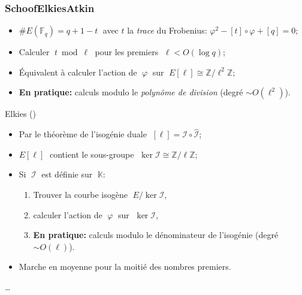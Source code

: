 \documentclass[10pt]{beamer}
\newcommand{\card}[1]{\# #1}  %
\newcommand{\Z}{\mathbb{Z}}  %
\newcommand{\K}{\mathbb{K}}  %
\newcommand{\F}{\mathbb{F}}  %
\newcommand{\isom}{\cong}  %
\newcommand{\frob}{\varphi}  %
\newcommand{\0}{\mathcal{O}}  %
\newcommand{\isog}[1]{\mathcal{#1}}  %
\newcommand{\I}{\isog{I}}  %
\begin{document}

\begin{frame}
  \frametitle{S{\scriptsize choof}E{\scriptsize lkies}A{\scriptsize tkin}}

  \begin{block}{\cite{schoof85}}
    \begin{itemize}
    \item $\card{E(\F_q)} = q + 1 - t\;$ avec $t$ la \emph{trace} du Frobenius:
      $\frob^2 - [t]\circ\frob + [q] = 0$;
    \item Calculer $\;t\bmod\ell\;$ pour les premiers $\;\ell<O(\log q)$;
    \item Équivalent à calculer l'action de $\;\frob\;$ sur $\;E[\ell]\isom\Z/\ell^2\Z$;
    \item \textbf{En pratique:} calculs modulo le \emph{polynôme de
        division} (\alert{degré $\sim O(\ell^2)$}).
    \end{itemize}
  \end{block}

  \begin{block}{Elkies (\cite{elkies98,schoof95})}
    \begin{itemize}
    \item Par le théorème de l'isogénie duale $\;[\ell] = \I\circ\hat{\I}$;
    \item $E[\ell]\;$ contient le sous-groupe $\;\ker\I\isom\Z/\ell\Z$;
    \item Si $\;\I\;$ est définie sur $\;\K$:
      \begin{enumerate}
      \item Trouver la \alert<2>{courbe isogène} $\;E/\ker\I$,
      \item calculer l'action de  $\;\frob\;$ sur $\;\ker\I$,
      \item \textbf{En pratique:} calculs modulo le
        \alert<2>{dénominateur} de l'isogénie (\alert{degré $\sim
          O(\ell)$}).
      \end{enumerate}
    \item Marche en moyenne pour la moitié des nombres premiers.
    \end{itemize}
  \end{block}
  
  \cite{atkin88}\dots
\end{frame}

\end{document}
